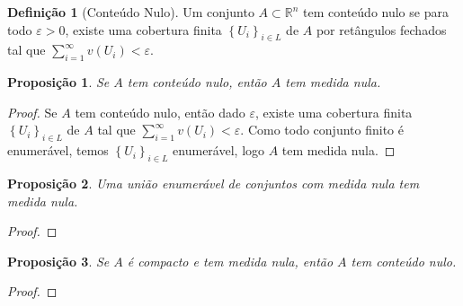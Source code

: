\documentclass{article}
\newtheorem{prop}{Proposição}[section]
\theoremstyle{theorem}
\theoremstyle{lemma}
\theoremstyle{definition}
\newtheorem{definicao}{Definição}[section]
\theoremstyle{remark}
\begin{document}
\begin{definicao}[Conteúdo Nulo]
	Um conjunto $A\subset \mathbb{R}^n$ tem conteúdo nulo se para todo $\varepsilon>0$,  existe uma cobertura finita    $\left\{ U_i \right\}_{i\in L}$ de  $A$ por retângulos fechados tal que $\displaystyle\sum_{i = 1}^{\infty} v\left(U_i\right) < \varepsilon$.
\end{definicao}
\begin{prop}
	Se $A$ tem conteúdo nulo, então $A$ tem medida nula.
\end{prop}
\begin{proof}
	Se $A$ tem conteúdo nulo, então dado $\varepsilon$,  existe uma cobertura finita $\left\{ U_i \right\}_{i \in L}$ de $A$ tal que $\displaystyle\sum_{i = 1}^{\infty} v\left(U_i\right) < \varepsilon$. Como todo conjunto finito é enumerável, temos $\left\{ U_i \right\}_{i\in L}$ enumerável, logo $A$ tem medida nula.
\end{proof}
\begin{prop}
	Uma união enumerável de conjuntos com medida nula tem medida nula.
\end{prop}
\begin{proof}
\end{proof}
\begin{prop}
	Se $A$ é compacto e tem medida nula, então $A$ tem conteúdo nulo.
\end{prop}
\begin{proof}
\end{proof}
\end{document}
